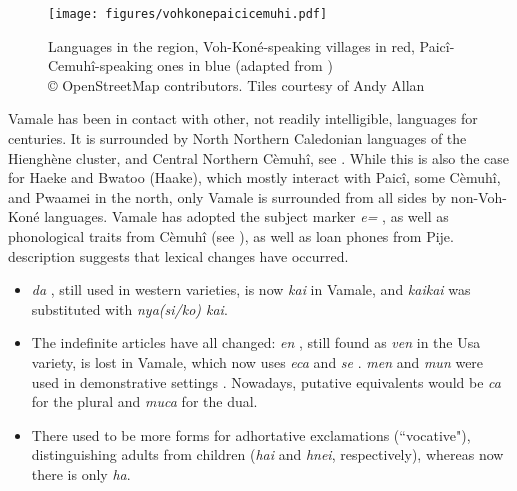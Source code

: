  \begin{figure}
 	\texttt{[image: figures/vohkonepaicicemuhi.pdf]}
 	\caption{Languages in the region, Voh-Koné-speaking villages in red, Paicî-Cemuhî-speaking ones in blue (adapted from \cite{gouvenementdelanouvelle-caledonie_explorateur_2019})\\\tiny © OpenStreetMap contributors. Tiles courtesy of Andy Allan}
 	\label{fig:map_languages}
 \end{figure}
 
 Vamale has been in contact with other, not readily intelligible, languages for centuries. %
 It is surrounded by North Northern Caledonian languages of the Hienghène cluster, and Central Northern Cèmuhî, see . While this is also the case for Haeke and Bwatoo (Haake), which mostly interact with Paicî, some Cèmuhî, and Pwaamei in the north, only Vamale is surrounded from all sides by non-Voh-Koné languages. Vamale has adopted the subject marker \textit{e=} , as well as phonological traits from Cèmuhî (see ), as well as loan phones from Pije.  description suggests that lexical changes have occurred. \parencite[162--168]{leenhardt_langues_1946}
 
 \begin{itemize}
 	\item \textit{da} , still used in western varieties, is now \textit{kai}  in Vamale, and \textit{kaikai}  was substituted with \textit{nya(si/ko) kai}.
 	\item The indefinite articles have all changed: \textit{en} , still found as \textit{ven} in the Usa variety, is lost in Vamale, which now uses \textit{eca}  and \textit{se} . \textit{men}  and \textit{mun}  were used in demonstrative settings \parencite[165]{leenhardt_langues_1946}. Nowadays, putative equivalents would be \textit{ca} for the plural and \textit{muca} for the dual. 
 	\item There used to be more forms for adhortative exclamations (``vocative"), distinguishing adults from children (\textit{hai} and \textit{hnei}, respectively), whereas now there is only \textit{ha}.
 \end{itemize}
 
